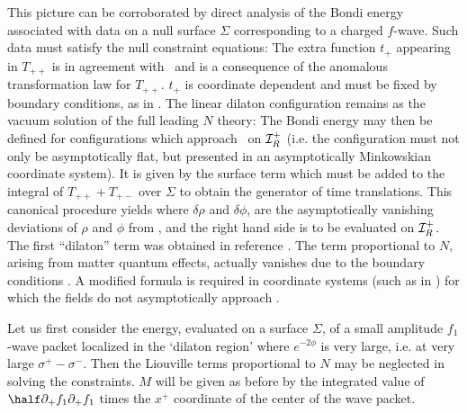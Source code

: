 This picture can be corroborated by direct analysis of the Bondi energy
associated with data on a null surface $\Sigma$ corresponding to a charged
$f$-wave.  Such data must satisfy the null constraint equations:
%
\eqn\ntyfour
{}
%
The extra function $t_+$ appearing in $T_{++}$ is in agreement with
\fifteen\ and is a consequence of the
anomalous transformation law for $T_{++}$. $t_+$ is coordinate dependent
and must be fixed by boundary conditions, as in \sixteen.
The linear dilaton configuration remains as the vacuum solution of the
full leading $N$ theory:
%
\eqn{}
%
The Bondi energy may then be defined for
configurations which approach \ntyfive\ on ${\cal I}^+_R$ (i.e. the
configuration must not only be asymptotically flat, but presented in
an asymptotically Minkowskian coordinate system).  It is
given by the surface term which must be added to the integral of
$T_{++} +T_{+-}$ over $\Sigma$ to obtain the generator of time
translations. This canonical procedure yields
%
\eqn{}
%
where $\delta \rho$ and $\delta \phi$, are the asymptotically vanishing
deviations of $\rho$ and $\phi$ from \ntyfive,
and the right hand side is to be evaluated on ${\cal
I}^+_R$. The first ``dilaton'' term was obtained in reference \Witt.
The term proportional to $N$, arising from matter quantum effects,
actually vanishes due to the boundary conditions \ntyfive.
A modified formula is required in coordinate systems (such as in \eleven)
for which the fields do not asymptotically approach \ntyfive.

Let us first consider the energy, evaluated on a surface $\Sigma$,
of a small amplitude $f_1$-wave packet
localized in the `dilaton region' where $e^{-2\phi}$ is very large,
i.e. at very large
$\sigma^+-\sigma^-$. Then the Liouville terms proportional to $N$ may be
neglected in solving the constraints.  $M$ will be given as before by
the integrated value of $\half \partial_+ f_1\partial _+ f_1$ times the $x^+$
coordinate of the center of the wave packet.

